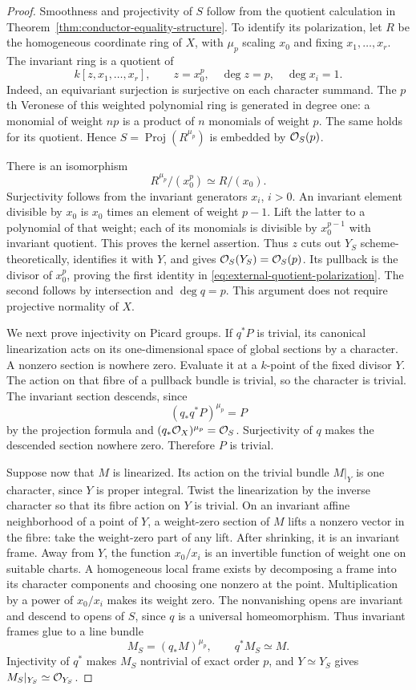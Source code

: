 \begin{proof}
Smoothness and projectivity of $S$ follow from the quotient
calculation in
Theorem~\ref{thm:conductor-equality-structure}.
To identify its polarization, let $R$ be the homogeneous
coordinate ring of $X$, with $\mu_p$ scaling $x_0$ and fixing
$x_1,\ldots,x_r$. The invariant ring is a quotient of
\[
 k[z,x_1,\ldots,x_r],\qquad z=x_0^p,\quad
 \deg z=p,\quad\deg x_i=1.
\]
Indeed, an equivariant surjection is surjective on each character
summand. The $p$th Veronese of this weighted polynomial ring
is generated in degree one: a monomial of weight $np$ is a
product of $n$ monomials of weight $p$. The same holds for its
quotient. Hence $S=\operatorname{Proj}(R^{\mu_p})$ is embedded
by $\mathcal O_S(p)$.

There is an isomorphism
\[
 R^{\mu_p}/(x_0^p)\simeq R/(x_0).
\]
Surjectivity follows from the invariant generators $x_i$, $i>0$.
An invariant element divisible by $x_0$ is $x_0$ times an element
of weight $p-1$. Lift the latter to a polynomial of that weight;
each of its monomials is divisible by $x_0^{p-1}$ with invariant
quotient. This proves the kernel assertion.
Thus $z$ cuts out $Y_S$ scheme-theoretically, identifies it with
$Y$, and gives $\mathcal O_S(Y_S)=\mathcal O_S(p)$.
Its pullback is the divisor of $x_0^p$, proving the first
identity in \eqref{eq:external-quotient-polarization}.
The second follows by intersection and $\deg q=p$.
This argument does not require projective normality of $X$.

We next prove injectivity on Picard groups. If $q^*P$ is trivial,
its canonical linearization acts on its one-dimensional space
of global sections by a character. A nonzero section is nowhere
zero. Evaluate it at a $k$-point of the fixed divisor $Y$.
The action on that fibre of a pullback bundle is trivial, so the
character is trivial. The invariant section descends, since
\[
 (q_*q^*P)^{\mu_p}=P
\]
by the projection formula and
$(q_*\mathcal O_X)^{\mu_p}=\mathcal O_S$.
Surjectivity of $q$ makes the descended section nowhere zero.
Therefore $P$ is trivial.

Suppose now that $M$ is linearized. Its action on the trivial
bundle $M|_Y$ is one character, since $Y$ is proper integral.
Twist the linearization by the inverse character so that its
fibre action on $Y$ is trivial.
On an invariant affine neighborhood of a point of $Y$, a
weight-zero section of $M$ lifts a nonzero vector in the fibre:
take the weight-zero part of any lift.
After shrinking, it is an invariant frame.
Away from $Y$, the function $x_0/x_i$ is an invertible function
of weight one on suitable charts. A homogeneous local frame
exists by decomposing a frame into its character components
and choosing one nonzero at the point. Multiplication by a
power of $x_0/x_i$ makes its weight zero.
The nonvanishing opens are invariant and descend to opens of
$S$, since $q$ is a universal homeomorphism.
Thus invariant frames glue to a line bundle
\[
 M_S=(q_*M)^{\mu_p},\qquad q^*M_S\simeq M.
\]
Injectivity of $q^*$ makes $M_S$ nontrivial of exact order $p$,
and $Y\simeq Y_S$ gives $M_S|_{Y_S}\simeq\mathcal O_{Y_S}$.


\end{proof}

